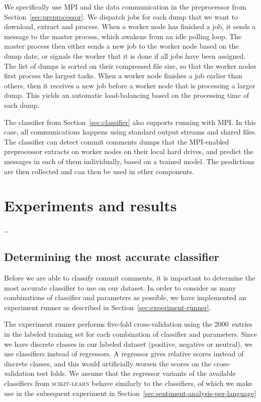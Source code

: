\documentclass{article}
\begin{document}
We specifically use MPI and the data communication in the preprocessor from 
Section~\ref{sec:preprocessor}. We dispatch jobs for each dump that we want to 
download, extract and process. When a worker node has finished a job, it sends 
a message to the master process, which awakens from an idle polling loop. The 
master process then either sends a new job to the worker node based on the dump 
date, or signals the worker that it is done if all jobs have been assigned. The 
list of dumps is sorted on their compressed file size, so that the worker nodes 
first process the largest tasks. When a worker node finishes a job earlier than 
others, then it receives a new job before a worker node that is processing a
larger dump. This yields an automatic load-balancing based on the processing
time of each dump.

The classifier from Section~\ref{sec:classifier} also supports running with 
MPI\@. In this case, all communications happens using standard output streams
and shared files. The classifier can detect commit comments dumps that the 
MPI-enabled preprocessor extracts on worker nodes on their local hard drives, 
and predict the messages in each of them individually, based on a trained 
model. The predictions are then collected and can then be used in other 
components.

\section{Experiments and results}\label{sec:experiments-and-results}
\ldots

\subsection{Determining the most accurate classifier}\label{sec:most-accurate-classifier}
Before we are able to classify commit comments, it is important to determine
the most accurate classifier to use on our dataset. In order to consider as
many combinations of classifier and parameters as possible, we have implemented
an experiment runner as described in Section~\ref{sec:experiment-runner}.

The experiment runner performs five-fold cross-validation using the 
2000~entries in the labeled training set for each combination of classifier and 
parameters. Since we have discrete classes in our labeled dataset (positive, 
negative or neutral), we use classifiers instead of regressors. A regressor 
gives relative scores instead of discrete classes, and this would artificially 
worsen the scores on the cross-validation test folds. We assume that the 
regressor variants of the available classifiers from \textsc{scikit-learn} 
behave similarly to the classifiers, of which we make use in the subsequent 
experiment in Section~\ref{sec:sentiment-analysis-per-language}
\end{document}
